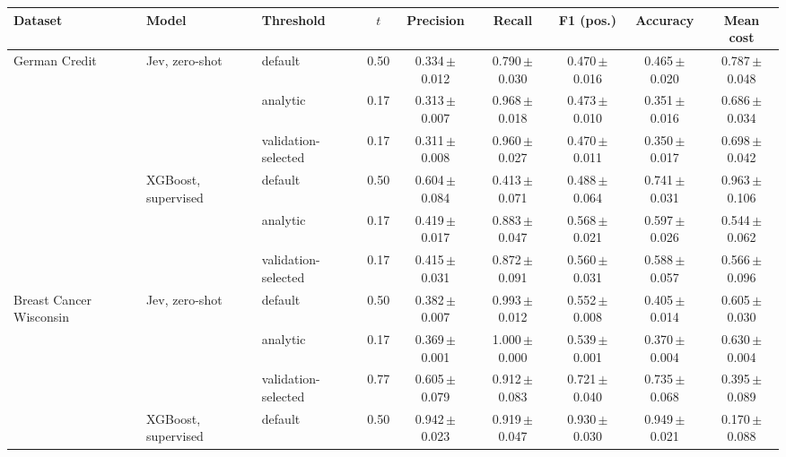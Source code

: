 \begin{tabular}{lllcccccc}
\toprule
Dataset & Model & Threshold & $t$ & Precision & Recall & F1 (pos.) & Accuracy & Mean cost \\
\midrule
\multirow{6}{*}{German Credit} & \multirow{3}{*}{Jev, zero-shot} & default & 0.50 & 0.334\,{\scriptsize$\pm$0.012} & 0.790\,{\scriptsize$\pm$0.030} & 0.470\,{\scriptsize$\pm$0.016} & 0.465\,{\scriptsize$\pm$0.020} & 0.787\,{\scriptsize$\pm$0.048} \\
 &  & analytic & 0.17 & 0.313\,{\scriptsize$\pm$0.007} & 0.968\,{\scriptsize$\pm$0.018} & 0.473\,{\scriptsize$\pm$0.010} & 0.351\,{\scriptsize$\pm$0.016} & 0.686\,{\scriptsize$\pm$0.034} \\
 &  & validation-selected & 0.17 & 0.311\,{\scriptsize$\pm$0.008} & 0.960\,{\scriptsize$\pm$0.027} & 0.470\,{\scriptsize$\pm$0.011} & 0.350\,{\scriptsize$\pm$0.017} & 0.698\,{\scriptsize$\pm$0.042} \\
\cmidrule(lr){2-9}
 & \multirow{3}{*}{XGBoost, supervised} & default & 0.50 & 0.604\,{\scriptsize$\pm$0.084} & 0.413\,{\scriptsize$\pm$0.071} & 0.488\,{\scriptsize$\pm$0.064} & 0.741\,{\scriptsize$\pm$0.031} & 0.963\,{\scriptsize$\pm$0.106} \\
 &  & analytic & 0.17 & 0.419\,{\scriptsize$\pm$0.017} & 0.883\,{\scriptsize$\pm$0.047} & 0.568\,{\scriptsize$\pm$0.021} & 0.597\,{\scriptsize$\pm$0.026} & 0.544\,{\scriptsize$\pm$0.062} \\
 &  & validation-selected & 0.17 & 0.415\,{\scriptsize$\pm$0.031} & 0.872\,{\scriptsize$\pm$0.091} & 0.560\,{\scriptsize$\pm$0.031} & 0.588\,{\scriptsize$\pm$0.057} & 0.566\,{\scriptsize$\pm$0.096} \\
\midrule
\multirow{6}{*}{Breast Cancer Wisconsin} & \multirow{3}{*}{Jev, zero-shot} & default & 0.50 & 0.382\,{\scriptsize$\pm$0.007} & 0.993\,{\scriptsize$\pm$0.012} & 0.552\,{\scriptsize$\pm$0.008} & 0.405\,{\scriptsize$\pm$0.014} & 0.605\,{\scriptsize$\pm$0.030} \\
 &  & analytic & 0.17 & 0.369\,{\scriptsize$\pm$0.001} & 1.000\,{\scriptsize$\pm$0.000} & 0.539\,{\scriptsize$\pm$0.001} & 0.370\,{\scriptsize$\pm$0.004} & 0.630\,{\scriptsize$\pm$0.004} \\
 &  & validation-selected & 0.77 & 0.605\,{\scriptsize$\pm$0.079} & 0.912\,{\scriptsize$\pm$0.083} & 0.721\,{\scriptsize$\pm$0.040} & 0.735\,{\scriptsize$\pm$0.068} & 0.395\,{\scriptsize$\pm$0.089} \\
\cmidrule(lr){2-9}
 & \multirow{3}{*}{XGBoost, supervised} & default & 0.50 & 0.942\,{\scriptsize$\pm$0.023} & 0.919\,{\scriptsize$\pm$0.047} & 0.930\,{\scriptsize$\pm$0.030} & 0.949\,{\scriptsize$\pm$0.021} & 0.170\,{\scriptsize$\pm$0.088} \\

\end{tabular}
